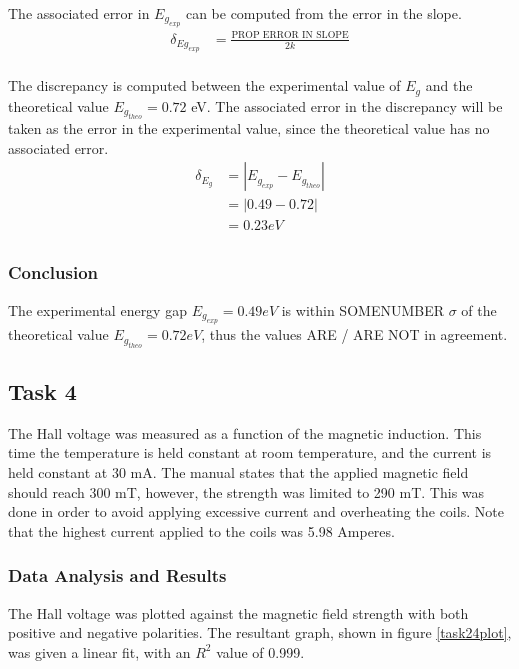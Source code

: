 \documentclass[a4paper]{article}
\begin{document}
The associated error in $E_{g_{exp}}$ can be computed from the error in the slope.
\begin{align*}
\delta_{Eg_{exp}} &= \frac{\text{PROP ERROR IN SLOPE}}{2k} \\
		
\end{align*}

The discrepancy is computed between the experimental value of $E_g$ and the theoretical value $E_{g_{theo}} = 0.72$ eV. The associated error in the discrepancy will be taken as the error in the experimental value, since the theoretical value has no associated error.
\begin{align*}
\delta_{E_g} &= | E_{g_{exp}} - E_{g_{theo}} | \\
		     &= | 0.49 - 0.72 | \\
		     &= 0.23 eV \\
\end{align*}

\subsubsection{Conclusion}
The experimental energy gap $E_{g_{exp}} = 0.49 eV$ is within SOMENUMBER $\sigma$ of the theoretical value $E_{g_{theo}} = 0.72 eV$, thus the values  ARE / ARE NOT in agreement.

\subsection{Task 4}

\qq The Hall voltage was measured as a function of the magnetic
induction. This time the temperature is held constant at room
temperature, and the current is held constant at 30 mA. The manual
states that the applied magnetic field should reach 300 mT,
however, the strength was limited to 290 mT. This was done in
order to avoid applying excessive current and overheating the coils. 
Note that the highest current applied to the coils was 5.98
Amperes.

\subsubsection{Data Analysis and Results}
\qq The Hall voltage was plotted against the magnetic field strength
with both positive and negative polarities. The resultant graph, shown in figure \ref{task24plot}, was
given a linear fit, with an $R^2$ value of 0.999.
\end{document}
